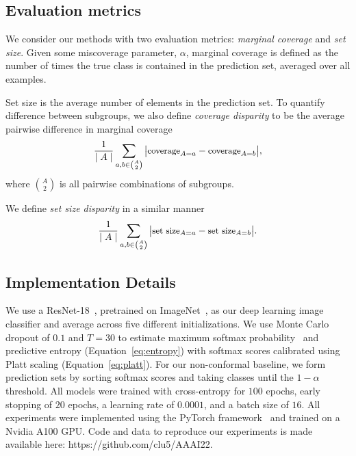 \documentclass[letterpaper]{article} %
\begin{document}
\subsection{Evaluation metrics}
We consider our methods with two evaluation metrics: \textit{marginal coverage} and \textit{set size}.
Given some miscoverage parameter, $\alpha$, marginal coverage is defined as the number of times the true class is contained in the prediction set, averaged over all examples.

Set size is the average number of elements in the prediction set.
To quantify difference between subgroups, we also define \textit{coverage disparity} to be the average pairwise difference in marginal coverage
\begin{equation} \label{eq:cov-disparity}
\small
\frac{1}{\mid A \mid} \sum_{a, b \in \binom{A}{2}} \big\lvert \text{coverage}_{A=a} - \text{coverage}_{A=b} \big\rvert,
\end{equation}
where $\binom{A}{2}$ is all pairwise combinations of subgroups.

We define \textit{set size disparity} in a similar manner
\begin{equation} \label{eq:card-disparity}
\small
\frac{1}{\mid A \mid} \sum_{a, b \in \binom{A}{2}} \big\lvert \text{set size}_{A=a} - \text{set size}_{A=b} \big\rvert.
\end{equation}

\subsection{Implementation Details}
We use a ResNet-18~\cite{DBLP:journals/corr/XieGDTH16}, pretrained on ImageNet~\cite{imagenet_cvpr09}, as our deep learning image classifier and average across five different initializations.
We use Monte Carlo dropout of $0.1$ and $T=30$ to estimate maximum softmax probability~\cite{hendrycks17baseline} and predictive entropy (Equation~\ref{eq:entropy}) with softmax scores calibrated using Platt scaling (Equation~\ref{eq:platt}).
For our non-conformal baseline, we form prediction sets by sorting softmax scores and taking classes until the $1 - \alpha$ threshold.
All models were trained with cross-entropy for $100$ epochs, early stopping of $20$ epochs, a learning rate of $0.0001$, and a batch size of $16$.
All experiments were implemented using the PyTorch framework~\cite{NEURIPS2019_9015} and trained on a Nvidia A100 GPU.
Code and data to reproduce our experiments is made available here: https://github.com/clu5/AAAI22.
\end{document}

